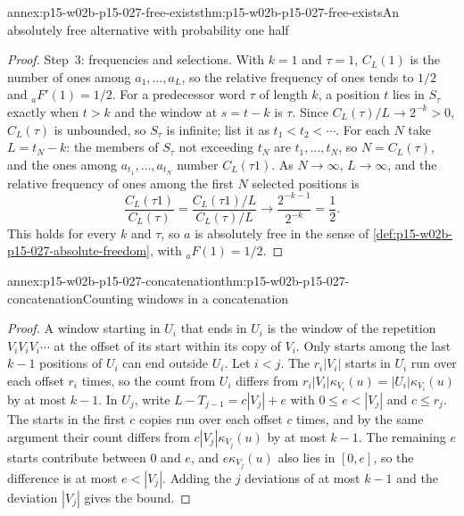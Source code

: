 \begin{annexitem}{annex:p15-w02b-p15-027-free-exists}{thm:p15-w02b-p15-027-free-exists}{An absolutely free alternative with probability one half}
\begin{proof}
Step~3: frequencies and selections. With \(k=1\) and \(\tau=1\),
\(C_L(1)\) is the number of ones among \(a_1,\ldots,a_L\), so the
relative frequency of ones tends to \(1/2\) and \({}_{a}F'(1)=1/2\).
For a predecessor word \(\tau\) of length \(k\), a position \(t\) lies in
\(S_\tau\) exactly when \(t>k\) and the window at \(s=t-k\) is \(\tau\).
Since \(C_L(\tau)/L\to2^{-k}>0\), \(C_L(\tau)\) is unbounded, so
\(S_\tau\) is infinite; list it as \(t_1<t_2<\cdots\). For each \(N\) take
\(L=t_N-k\): the members of \(S_\tau\) not exceeding \(t_N\) are
\(t_1,\ldots,t_N\), so \(N=C_L(\tau)\), and the ones among
\(a_{t_1},\ldots,a_{t_N}\) number \(C_L(\tau1)\). As \(N\to\infty\),
\(L\to\infty\), and the relative frequency of ones among the first \(N\)
selected positions is
\[
 \frac{C_L(\tau1)}{C_L(\tau)}
 =\frac{C_L(\tau1)/L}{C_L(\tau)/L}\longrightarrow\frac{2^{-k-1}}{2^{-k}}=\frac12 .
\]
This holds for every \(k\) and \(\tau\), so \(a\) is absolutely free in the
sense of \cref{def:p15-w02b-p15-027-absolute-freedom}, with
\({}_{a}F(1)=1/2\).
\end{proof}
\end{annexitem}

\begin{annexitem}{annex:p15-w02b-p15-027-concatenation}{thm:p15-w02b-p15-027-concatenation}{Counting windows in a concatenation}
\begin{proof}
A window starting in \(U_i\) that ends in \(U_i\) is the window of the
repetition \(V_iV_iV_i\cdots\) at the offset of its start within its
copy of \(V_i\). Only starts among the last \(k-1\) positions of \(U_i\)
can end outside \(U_i\). Let \(i<j\). The \(r_i|V_i|\) starts in \(U_i\)
run over each offset \(r_i\) times, so the count from \(U_i\) differs from
\(r_i|V_i|\kappa_{V_i}(u)=|U_i|\kappa_{V_i}(u)\) by at most \(k-1\).
In \(U_j\), write \(L-T_{j-1}=c|V_j|+e\) with \(0\leq e<|V_j|\) and
\(c\leq r_j\). The starts in the first \(c\) copies run over each offset
\(c\) times, and by the same argument their count differs from
\(c|V_j|\kappa_{V_j}(u)\) by at most \(k-1\). The remaining \(e\) starts
contribute between \(0\) and \(e\), and \(e\kappa_{V_j}(u)\) also lies in
\([0,e]\), so the difference is at most \(e<|V_j|\). Adding the \(j\)
deviations of at most \(k-1\) and the deviation \(|V_j|\) gives the
bound.
\end{proof}
\end{annexitem}

